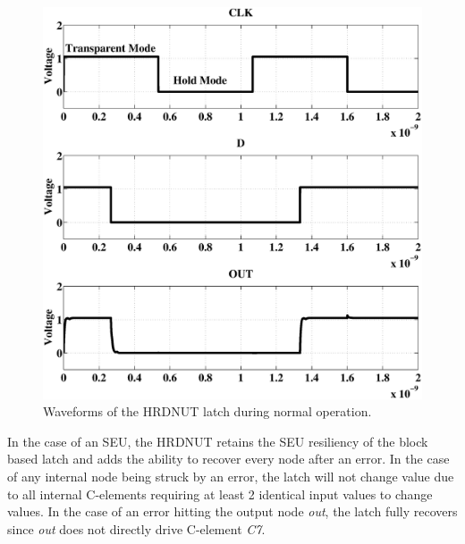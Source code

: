 \begin{figure}[!htbp]
	\centering
	\includegraphics[trim = 0mm 5mm 0mm 15mm, clip, width=0.80\linewidth]{Figures/defaultoperation.eps}
	\caption{Waveforms of the HRDNUT latch during normal operation.}
	\label{NormOp}
\end{figure}

In the case of an SEU, the HRDNUT retains the SEU resiliency of the block based latch and adds the ability to recover every node after an error. In the case of any internal node being struck by an error, the latch will not change value due to all internal C-elements requiring at least 2 identical input values to change values. In the case of an error hitting the output node \textit{out}, the latch fully recovers since \textit{out} does not directly drive C-element \textit{C7}.

